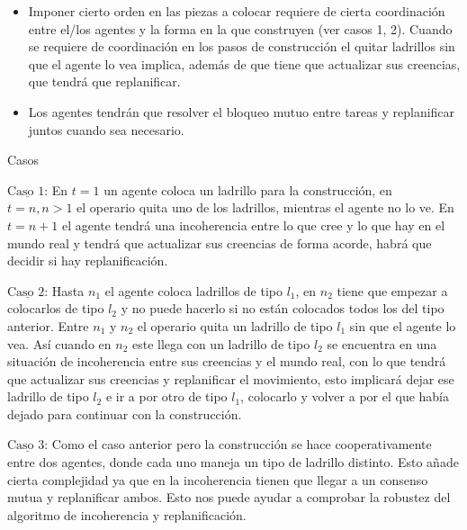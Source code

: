 \documentclass[12pt]{report}
\newcommand{\textunderline}[1]{$\underline{\mbox{#1}}$} %
\newcommand{\mksection}[1]{{\large {\color{NavyBlue} #1}}}
\begin{document}
  \begin{itemize}
    \item Imponer cierto orden en las piezas a colocar requiere de cierta coordinaci\'on entre el/los agentes y la forma en la que construyen (ver casos 1, 2). Cuando se requiere de coordinaci\'on en los pasos de construcci\'on el quitar ladrillos sin que el agente lo vea implica, adem\'as de que tiene que actualizar sus creencias, que tendr\'a que replanificar.
    \item Los agentes tendr\'an que resolver el bloqueo mutuo entre tareas y replanificar juntos cuando sea necesario.
  \end{itemize}

\mksection{Casos} 

  \textunderline{Caso 1:} En $t = 1$ un agente coloca un ladrillo para la construcci\'on, en $t = n, n > 1$ el operario quita uno de los ladrillos, mientras el agente no lo ve. En $t = n + 1$ el agente tendr\'a una incoherencia entre lo que cree y lo que hay en el mundo real y tendr\'a que actualizar sus creencias de forma acorde, habr\'a que decidir si hay replanificaci\'on.

  \textunderline{Caso 2:} Hasta $n_{1}$ el agente coloca ladrillos de tipo $l_{1}$, en $n_{2}$ tiene que empezar a colocarlos de tipo $l_{2}$ y no puede hacerlo si no est\'an colocados todos los del tipo anterior. Entre $n_{1}$ y $n_{2}$ el operario quita un ladrillo de tipo $l_{1}$ sin que el agente lo vea. As\'i cuando en $n_{2}$ este llega con un ladrillo de tipo $l_{2}$ se encuentra en una situaci\'on de incoherencia entre sus creencias y el mundo real, con lo que tendr\'a que actualizar sus creencias y replanificar el movimiento, esto implicar\'a dejar ese ladrillo de tipo $l_{2}$ e ir a por otro de tipo $l_{1}$, colocarlo y volver a por el que hab\'ia dejado para continuar con la construcci\'on.

  \textunderline{Caso 3:} Como el caso anterior pero la construcci\'on se hace cooperativamente entre dos agentes, donde cada uno maneja un tipo de ladrillo distinto. Esto a\~nade cierta complejidad ya que en la incoherencia tienen que llegar a un consenso mutua y replanificar ambos. Esto nos puede ayudar a comprobar la robustez del algoritmo de incoherencia y replanificaci\'on.
\end{document}
